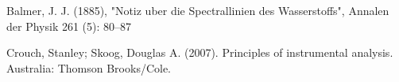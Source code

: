 \documentclass{article}
\begin{document}

\begin{thebibliography}{9}

Balmer, J. J. (1885), "Notiz uber die Spectrallinien des Wasserstoffs", Annalen der 
Physik 261 (5): 80–87

Crouch, Stanley; Skoog, Douglas A. (2007). Principles of instrumental analysis. Australia: 
Thomson Brooks/Cole.

\end{thebibliography}
\end{document}
